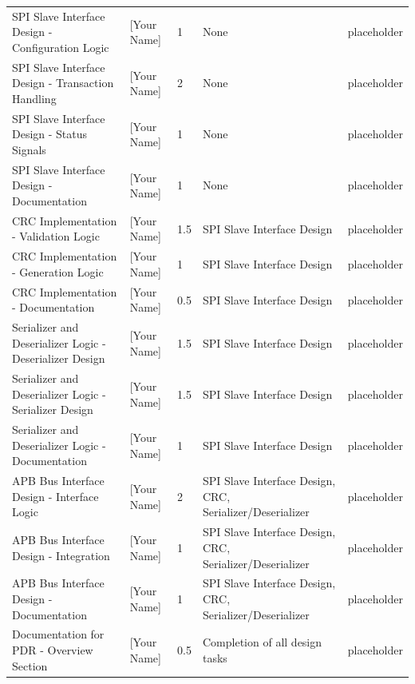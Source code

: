 \begin{longtable}{| m{} | m{} | m{} | m{} | m{} |}
    SPI Slave Interface Design - Configuration Logic	        & [Your Name] & 1	& None	                                                    & placeholder \\
    SPI Slave Interface Design - Transaction Handling	        & [Your Name] &	2	& None	                                                    & placeholder \\
    SPI Slave Interface Design - Status Signals	                & [Your Name] &	1	& None	                                                    & placeholder \\
    SPI Slave Interface Design - Documentation	                & [Your Name] &	1	& None	                                                    & placeholder \\
    CRC Implementation - Validation Logic	                    & [Your Name] &	1.5	& SPI Slave Interface Design	                            & placeholder \\
    CRC Implementation - Generation Logic	                    & [Your Name] &	1	& SPI Slave Interface Design	                            & placeholder \\
    CRC Implementation - Documentation	                        & [Your Name] &	0.5	& SPI Slave Interface Design	                            & placeholder \\
    Serializer and Deserializer Logic - Deserializer Design	    & [Your Name] &	1.5	& SPI Slave Interface Design	                            & placeholder \\
    Serializer and Deserializer Logic - Serializer Design	    & [Your Name] &	1.5	& SPI Slave Interface Design	                            & placeholder \\
    Serializer and Deserializer Logic - Documentation	        & [Your Name] &	1	& SPI Slave Interface Design	                            & placeholder \\
    APB Bus Interface Design - Interface Logic	                & [Your Name] &	2	& SPI Slave Interface Design, CRC, Serializer/Deserializer	& placeholder \\
    APB Bus Interface Design - Integration	                    & [Your Name] &	1	& SPI Slave Interface Design, CRC, Serializer/Deserializer	& placeholder \\
    APB Bus Interface Design - Documentation	                & [Your Name] &	1	& SPI Slave Interface Design, CRC, Serializer/Deserializer	& placeholder \\
    Documentation for PDR - Overview Section	                & [Your Name] &	0.5	& Completion of all design tasks	                        & placeholder \\

\end{longtable}
